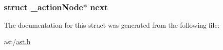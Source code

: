 \subsubsection[{\texorpdfstring{next}{next}}]{\setlength{\rightskip}{0pt plus 5cm}struct {\bf \+\_\+action\+Node}$\ast$ next}\hypertarget{struct__action_node_a99f2a1b315217397adbc19ed2501d4d0}{}\label{struct__action_node_a99f2a1b315217397adbc19ed2501d4d0}


The documentation for this struct was generated from the following file\+:\begin{DoxyCompactItemize}
\item 
ast/\hyperlink{ast_8h}{ast.\+h}\end{DoxyCompactItemize}
